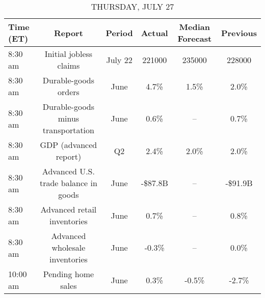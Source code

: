 \documentclass{article}%
\begin{document}
%


\begin{table}[htbp]%
\caption{THURSDAY, JULY 27}%
\centering%
\begin{adjustbox}{width=1\textwidth}%
\begin{tabular}{lccccc}
\toprule
Time (ET) &                               Report &  Period &  Actual & Median Forecast & Previous \\
\midrule
  8:30 am &               Initial jobless claims & July 22 &  221000 &          235000 &   228000 \\
  8:30 am &                 Durable-goods orders &    June &    4.7\% &            1.5\% &     2.0\% \\
  8:30 am &   Durable-goods minus transportation &    June &    0.6\% &              -- &     0.7\% \\
  8:30 am &                GDP (advanced report) &      Q2 &    2.4\% &            2.0\% &     2.0\% \\
  8:30 am & Advanced U.S. trade balance in goods &    June & -\$87.8B &              -- &  -\$91.9B \\
  8:30 am &          Advanced retail inventories &    June &    0.7\% &              -- &     0.8\% \\
  8:30 am &       Advanced wholesale inventories &    June &   -0.3\% &              -- &     0.0\% \\
 10:00 am &                   Pending home sales &    June &    0.3\% &           -0.5\% &    -2.7\% \\
\bottomrule
\end{tabular}
%
\end{adjustbox}%
\end{table}

%
\end{document}
